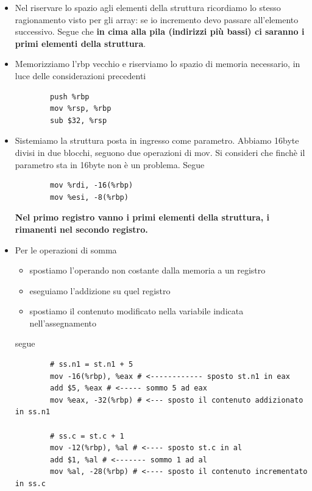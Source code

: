 \begin{itemize}
	\item Nel riservare lo spazio agli elementi della struttura ricordiamo lo stesso ragionamento visto per gli array: se io incremento devo passare all'elemento successivo. Segue che \textbf{in cima alla pila (indirizzi più bassi) ci saranno i primi elementi della struttura}.
	
	\item Memorizziamo l'rbp vecchio e riserviamo lo spazio di memoria necessario, in luce delle considerazioni precedenti
	\begin{verbatim}
		push %rbp
		mov %rsp, %rbp
		sub $32, %rsp
	\end{verbatim}
	\item Sistemiamo la struttura posta in ingresso come parametro. Abbiamo 16byte divisi in due blocchi, seguono due operazioni di mov. Si consideri che finchè il parametro sta in 16byte non è un problema. Segue
	\begin{verbatim}
		mov %rdi, -16(%rbp)
		mov %esi, -8(%rbp)
	\end{verbatim}
	\textbf{Nel primo registro vanno i primi elementi della struttura, i rimanenti nel secondo registro.}
	\item Per le operazioni di somma
	\begin{itemize}
		\item spostiamo l'operando non costante dalla memoria a un registro
		\item eseguiamo l'addizione su quel registro
		\item spostiamo il contenuto modificato nella variabile indicata nell'assegnamento
	\end{itemize}
	segue
	\small
	\begin{verbatim}
		# ss.n1 = st.n1 + 5
		mov -16(%rbp), %eax # <------------ sposto st.n1 in eax
		add $5, %eax # <----- sommo 5 ad eax
		mov %eax, -32(%rbp) # <--- sposto il contenuto addizionato in ss.n1
		
		# ss.c = st.c + 1
		mov -12(%rbp), %al # <---- sposto st.c in al
		add $1, %al # <------- sommo 1 ad al
		mov %al, -28(%rbp) # <---- sposto il contenuto incrementato in ss.c
		

\end{verbatim}
\end{itemize}
